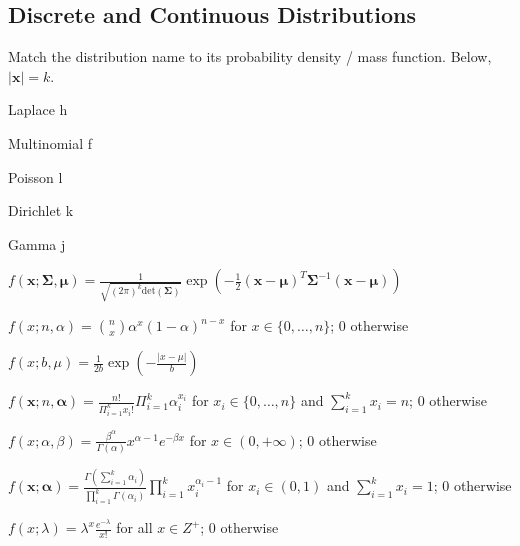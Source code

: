 \documentclass[a4paper]{article}
\theoremstyle{definition}
\newcommand{\vc}[1]{\boldsymbol{#1}}
\newcommand{\xv}{\vc{x}}
\newcommand{\Sigmav}{\vc{\Sigma}}
\newcommand{\alphav}{\vc{\alpha}}
\newcommand{\muv}{\vc{\mu}}
\newenvironment{soln}{
    \leavevmode\color{blue}\ignorespaces
}{}
\begin{document}
\subsection{Discrete and Continuous Distributions}
Match the distribution name to its probability density / mass
function. Below, $|\xv| = k$.
\begin{enumerate}[(a)]
\begin{minipage}{0.3\linewidth}
    \item Laplace \begin{soln}  h \end{soln}
    \item Multinomial \begin{soln}  f \end{soln}
    \item Poisson \begin{soln}  l \end{soln}
    \item Dirichlet \begin{soln}  k \end{soln}
    \item Gamma \begin{soln}  j \end{soln}
\end{minipage}
\begin{minipage}{0.5\linewidth}
    \item $f(\xv; \Sigmav, \muv) = \frac{1}{\sqrt{(2\pi)^k \mathrm{det}(\Sigmav) }} \exp\left( -\frac{1}{2}
        (\xv - \muv)^T \Sigmav^{-1} (\xv - \muv)  \right)$
    \item $f(x; n, \alpha) = \binom{n}{x} \alpha^x (1 - \alpha)^{n-x}$
      for $x \in \{0,\ldots, n\}$; $0$ otherwise
    \item $f(x; b, \mu) = \frac{1}{2b} \exp\left( - \frac{|x - \mu|}{b} \right)$
    \item $f(\xv; n, \alphav) = \frac{n!}{\Pi_{i=1}^k x_i!}
      \Pi_{i=1}^k \alpha_i^{x_i}$ for $x_i \in \{0,\ldots,n\}$ and
      $\sum_{i=1}^k x_i = n$; $0$ otherwise
    \item $f(x; \alpha, \beta) = \frac{\beta^{\alpha}}{\Gamma(\alpha)} x^{\alpha -
        1}e^{-\beta x}$ for $x \in (0,+\infty)$; $0$ otherwise
    \item $f(\xv; \alphav) = \frac{\Gamma(\sum_{i=1}^k
        \alpha_i)}{\prod_{i=1}^k \Gamma(\alpha_i)} \prod_{i=1}^{k}
      x_i^{\alpha_i - 1}$ for $x_i \in (0,1)$ and $\sum_{i=1}^k x_i =
      1$; 0 otherwise
    \item $f(x; \lambda) = \lambda^x \frac{e^{-\lambda}}{x!}$ for all
      $x \in Z^+$; $0$ otherwise
\end{minipage}
\end{enumerate}
        
\end{document}
